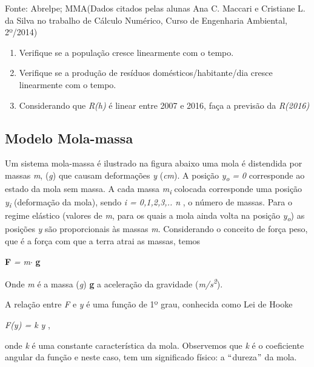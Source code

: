 Fonte: Abrelpe; MMA\tab (Dados citados pelas alunas Ana C. Maccari e Cristiane L. da Silva  no trabalho de Cálculo Numérico, Curso de Engenharia Ambiental, 2º/2014)

\begin{enumerate}
	\item Verifique se a população cresce linearmente com o tempo.

	\item Verifique se a produção de resíduos domésticos/habitante/dia cresce linearmente com o tempo.

	\item Considerando que \textit{R(h)} é linear entre 2007 e 2016, faça a previsão da \textit{R(2016)} \qedsymbol{}
\end{enumerate}

\subsection{Modelo Mola-massa}

Um sistema mola-massa é ilustrado na figura abaixo uma mola é distendida por massas \textit{m}, (\textit{g}) que causam deformações  \textit{y } (\textit{cm}). A posição \textit{y\textsubscript{o}} \textit{= 0} corresponde ao estado da mola sem massa. A cada massa \textit{m\textsubscript{i}} colocada corresponde uma posição \textit{y\textsubscript{i}} (deformação da mola), sendo \textit{i = 0,1,2,3,.. n} , o número de massas. Para o regime elástico (valores de \textit{m}, para os quais a mola ainda volta na posição \textit{y\textsubscript{o}}) as posições \textit{y} são proporcionais às massas \textit{m}. Considerando o conceito de força peso, que é a força com que a terra atrai as massas, temos

\textbf{F}\textit{ = m$ \cdot $  }\textbf{g}

Onde \textit{m} é a massa (\textit{g})  \textbf{g} a aceleração da gravidade (\textit{m/s\textsuperscript{2}}).

A relação entre \textit{F} e \textit{y}  é uma função de 1º grau, conhecida como Lei de Hooke

\textit{\tab F(y) = k y} ,   

onde \textit{k} é uma constante característica da mola. Observemos que \textit{k} é o coeficiente angular da função e neste caso, tem um significado físico: a $``$dureza$"$  da mola.


